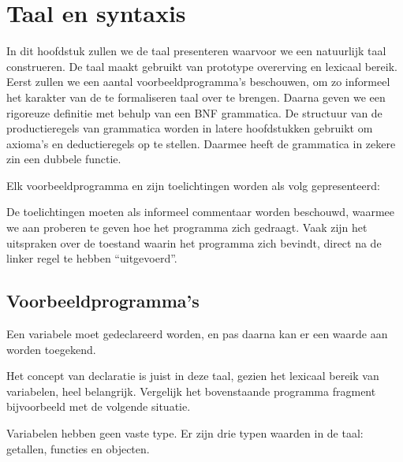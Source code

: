 
\chapter{Taal en syntaxis}

In dit hoofdstuk zullen we de taal presenteren waarvoor we een natuurlijk taal construeren. De taal maakt gebruikt van prototype overerving en lexicaal bereik. Eerst zullen we een aantal voorbeeldprogramma's beschouwen, om zo informeel het karakter van de te formaliseren taal over te brengen. Daarna geven we een rigoreuze definitie met behulp van een BNF grammatica. De structuur van de productieregels van grammatica worden in latere hoofdstukken gebruikt om axioma's en deductieregels op te stellen. Daarmee heeft de grammatica in zekere zin een dubbele functie.

Elk voorbeeldprogramma en zijn toelichtingen worden als volg gepresenteerd:

\codeFragmentCaption
{}

De toelichtingen moeten als informeel commentaar worden beschouwd, waarmee we aan proberen te geven hoe het programma zich gedraagt. Vaak zijn het uitspraken over de toestand waarin het programma zich bevindt, direct na de linker regel te hebben ``uitgevoerd''.

\section{Voorbeeldprogramma's}

Een variabele moet gedeclareerd worden, en pas daarna kan er een waarde aan worden toegekend.

\newCodeFragment
{}

Het concept van declaratie is juist in deze taal, gezien het lexicaal bereik van variabelen, heel belangrijk. Vergelijk het bovenstaande programma fragment bijvoorbeeld met de volgende situatie.

Variabelen hebben geen vaste type. Er zijn drie typen waarden in de taal: getallen, functies en objecten.

